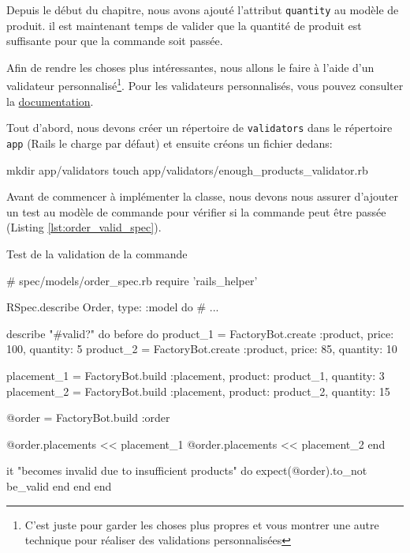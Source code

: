 \documentclass[]{report}
\begin{document}
    Depuis le début du chapitre, nous avons ajouté l'attribut \verb|quantity| au modèle de produit. il est maintenant temps de valider que la quantité de produit est suffisante pour que la commande soit passée.

    Afin de rendre les choses plus intéressantes, nous allons le faire à l'aide d'un validateur personnalisé\footnote{C'est juste pour garder les choses plus propres et vous montrer une autre technique pour réaliser des validations personnalisées}. Pour les validateurs personnalisés, vous pouvez consulter la \href{https://guides.rubyonrails.org/active_record_validations.html#performing-custom-validations}{documentation}.

    Tout d'abord, nous devons créer un répertoire de \verb|validators| dans le répertoire \verb|app| (Rails le charge par défaut) et ensuite créons un fichier dedans:

    \begin{bashcode}
    mkdir app/validators
    touch app/validators/enough_products_validator.rb
    \end{bashcode}

    Avant de commencer à implémenter la classe, nous devons nous assurer d'ajouter un test au modèle de commande pour vérifier si la commande peut être passée (Listing \ref{lst:order_valid_spec}).


    \begin{listing}
      \caption{Test de la validation de la commande}
      \label{lst:order_valid_spec}
      \begin{rubycode}
      # spec/models/order_spec.rb
      require 'rails_helper'

      RSpec.describe Order, type: :model do
        # ...

        describe "#valid?" do
          before do
            product_1 = FactoryBot.create :product, price: 100, quantity: 5
            product_2 = FactoryBot.create :product, price: 85, quantity: 10


            placement_1 = FactoryBot.build :placement, product: product_1, quantity: 3
            placement_2 = FactoryBot.build :placement, product: product_2, quantity: 15

            @order = FactoryBot.build :order

            @order.placements << placement_1
            @order.placements << placement_2
          end

          it "becomes invalid due to insufficient products" do
            expect(@order).to_not be_valid
          end
        end
      end
      \end{rubycode}
    \end{listing}
\end{document}
